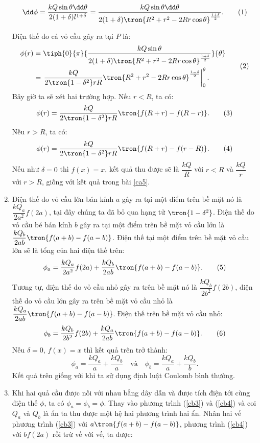\begin{loigiai}
\begin{enumerate}[1)]
            \[\dd\phi=\dfrac{kQ\sin\theta\dd\theta}{2(1+\delta)l^{1+\delta}}=\dfrac{kQ\sin\theta\dd\theta}{2(1+\delta)\tron{R^2+r^2-2Rr\cos\theta}^{\frac{1+\delta}{2}}}. \tag{1}\]

        Điện thế do cả vỏ cầu gây ra tại $P$ là:
        \[\begin{aligned}
           \phi(r)&=\tiph{0}{\pi}{\dfrac{kQ\sin\theta}{2(1+\delta)\tron{R^2+r^2-2Rr\cos\theta}^{\frac{1+\delta}{2}}}}{\theta}\\
           &=\left.\dfrac{kQ}{2\tron{1-\delta^2}rR}\tron{R^2+r^2-2Rr\cos\theta}^{\frac{1-\delta}{2}}\right|_0^\theta.
        \end{aligned} \tag{2}\]
        Bây giờ ta sẽ xét hai trường hợp. Nếu $r<R$, ta có:
           \[ \phi(r)=\dfrac{kQ}{2\tron{1-\delta^2}rR}\tron{f(R+r)-f(R-r)}.\tag{3}\]
        Nếu $r>R$, ta có:
        \[\phi(r)=\dfrac{kQ}{2\tron{1-\delta^2}rR}\tron{f(R+r)-f(r-R)}. \tag{4}\]
        Nếu như $\delta=0$ thì $f(x)=x$, kết quả thu được sẽ là $\dfrac{kQ}{R}$ với $r<R$ và $\dfrac{kQ}{r}$ với $r>R$, giống với kết quả trong bài \ref{ca5}.
        \item Điện thế do vỏ cầu lớn bán kính $a$ gây ra tại một điểm trên bề mặt nó là $\dfrac{kQ_a}{2a^2}f(2a)$, tại đây chúng ta đã bỏ qua hạng tử $\tron{1-\delta^2}$. Điện thế do vỏ cầu bé bán kính $b$ gây ra tại một điểm trên bề mặt vỏ cầu lớn là $\dfrac{kQ_b}{2ab}\tron{f(a+b)-f(a-b)}$. Điện thế tại một điểm trên bề mặt vỏ cầu lớn sẽ là tổng của hai điện thế trên:
            \[\phi_a=\dfrac{kQ_a}{2a^2}f(2a)+\dfrac{kQ_b}{2ab}\tron{f(a+b)-f(a-b)}. \tag{5}\label{cb3}\]
        Tương tự, điện thế do vỏ cầu nhỏ gây ra trên bề mặt nó là $\dfrac{kQ_b}{2b^2}f(2b)$, điện thế do vỏ cầu lớn gây ra trên bề mặt vỏ cầu nhỏ là $\dfrac{kQ_a}{2ab}\tron{f(a+b)-f(a-b)}$. Điện thế trên bề mặt vỏ cầu nhỏ:
            \[\phi_b=\dfrac{kQ_b}{2b^2}f(2b)+\dfrac{kQ_a}{2ab}\tron{f(a+b)-f(a-b)}.\tag{6}\label{cb4}
            \]
        Nếu $\delta=0$, $f(x)=x$ thì kết quả trên trở thành:
            \[\phi_a=\dfrac{kQ_a}{a}+\dfrac{kQ_b}{a}\quad \text{và} \quad \phi_b=\dfrac{kQ_a}{a}+\dfrac{kQ_b}{b}.
           \tag{7} \]
        Kết quả trên giống với khi ta sử dụng định luật Coulomb bình thường.
        \item Khi hai quả cầu được nối với nhau bằng dây dẫn và được tích điện tới cùng điện thế $\phi$, ta có $\phi_a=\phi_b=\phi$. Thay vào phương trình (\ref{cb3}) và (\ref{cb4}) và coi $Q_a$ và $Q_b$ là ẩn ta thu được một hệ hai phương trình hai ẩn. Nhân hai vế phương trình (\ref{cb3}) với $a\tron{f(a+b)-f(a-b)}$, phương trình (\ref{cb4}) với $bf(2a)$ rồi trừ vế với vế, ta được:

\end{enumerate}
\end{loigiai}
